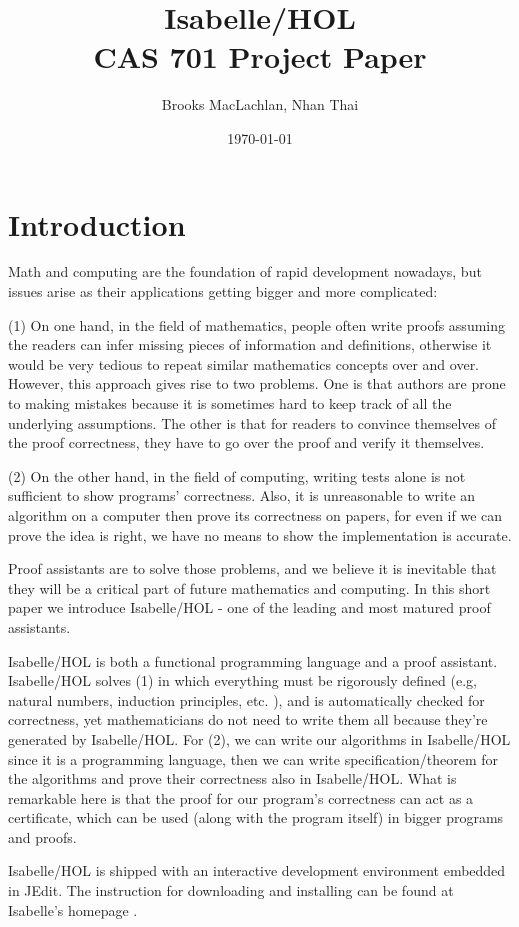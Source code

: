 \documentclass{article}
\title{Isabelle/HOL \\ \large CAS 701 Project Paper}
\author{Brooks MacLachlan, Nhan Thai}
\date{\today}
\begin{document}
	
\maketitle

\newpage
\section{Introduction}
Math and computing are the foundation of rapid development nowadays, but issues arise as their applications getting bigger and
more complicated:

(1) On one hand, in the field of mathematics, people often write proofs assuming
the readers can infer missing pieces of information and definitions,
otherwise it would be very tedious to repeat similar mathematics concepts
over and over. However, this approach gives rise to two problems. One is
that authors are prone to making mistakes because it is sometimes hard to
keep track of all the underlying assumptions. The other is that for readers
to convince themselves of the proof correctness, they have to go over the
proof and verify it themselves.

(2) On the other hand, in the field of computing, writing tests alone is not
sufficient to show programs' correctness.
Also, it is unreasonable to write an algorithm on a computer then prove its
correctness on papers, for even if we can prove the idea is right, we have
no means to show the implementation is accurate.


Proof assistants are to solve those problems,
and we believe it is inevitable that they will be a critical part of future mathematics and computing.
In this short paper we introduce Isabelle/HOL - one of the leading and most matured proof assistants.

Isabelle/HOL is both a functional programming language and a proof assistant.
Isabelle/HOL solves (1) in which everything must be rigorously defined (e.g, natural numbers, induction principles, etc. ),
and is automatically checked for correctness, yet mathematicians do not need to write them all
because they're generated by Isabelle/HOL. For (2), we can write our algorithms in Isabelle/HOL since
it is a programming language, then we can write specification/theorem for the algorithms and prove their
correctness also in Isabelle/HOL. What is remarkable here is that the proof for our program's correctness
can act as a certificate, which can be used (along with the program itself) in bigger programs and proofs.

Isabelle/HOL is shipped with an interactive development environment embedded in JEdit.
The instruction for downloading and installing can be found at Isabelle's homepage \cite{IsabelleWebsite}.
\end{document}

